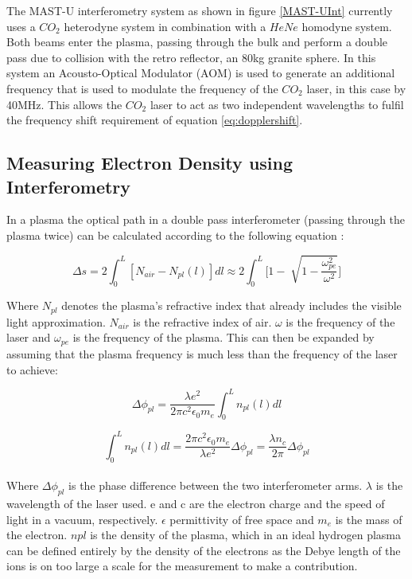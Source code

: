 \documentclass[12pt,a4paper,oneside]{report}
\begin{document}
The MAST-U interferometry system as shown in figure \autoref{MAST-UInt} currently uses a $CO_{2}$ heterodyne system in combination with a $HeNe$ homodyne system. Both beams enter the plasma, passing through the bulk and perform a double pass due to collision with the retro reflector, an 80kg granite sphere. In this system an Acousto-Optical Modulator (AOM) is used to generate an additional frequency that is used to modulate the frequency of the $CO_{2}$ laser, in this case by 40MHz. This allows the $CO_{2}$ laser to act as two independent wavelengths to fulfil the frequency shift requirement of equation \ref{eq:dopplershift}.

    \subsection{Measuring Electron Density using Interferometry}
In a plasma the optical path in a double pass interferometer (passing through the plasma twice) can be calculated according to the following equation \cite[p.~26]{Brunner2017} :

\begin{equation}
	\Delta s = 2 \int_{0}^{L} [N_{air} - N_{pl}(l)]dl \approx 2 \int_{0}^{L} \Bigg[1 - \sqrt[]{1-\frac{\omega_{pe}^{2}}{\omega^{2}}}\Bigg]
	\label{eq:opticalpathint}
\end{equation}

Where $N_{pl}$ denotes the plasma's refractive index that already includes the visible light approximation. $N_{air}$ is the refractive index of air. $\omega$ is the frequency of the laser and $\omega_{pe}$ is the frequency of the plasma. This can then be expanded by assuming that the plasma frequency is much less than the frequency of the laser to achieve:

\begin{equation}
	\Delta\phi_{pl} = \frac{\lambda e^{2}}{2 \pi c^{2} \epsilon_{0} m_{e}} \int_{0}^{L} n_{pl} (l) dl
	\label{eq:plasmaphase}
\end{equation}

\begin{equation}
	\int_{0}^{L} n_{pl} (l) dl = \frac{2 \pi c^{2} \epsilon_{0} m_{e}}{\lambda e^{2}} \Delta\phi_{pl} = \frac{\lambda n_{c}}{2 \pi} \Delta\phi_{pl}
	\label{eq:phaseintegral}
\end{equation}
\\
Where $\Delta\phi_{pl}$ is the phase difference between the two interferometer arms. $\lambda$ is the wavelength of the laser used. e and c are the electron charge and the speed of light in a vacuum, respectively. $\epsilon$ permittivity of free space and $m_{e}$ is the mass of the electron. $n{pl}$ is the density of the plasma, which in an ideal hydrogen plasma can be defined entirely by the density of the electrons as the Debye length of the ions is on too large a scale for the measurement to make a contribution. 
\end{document}

